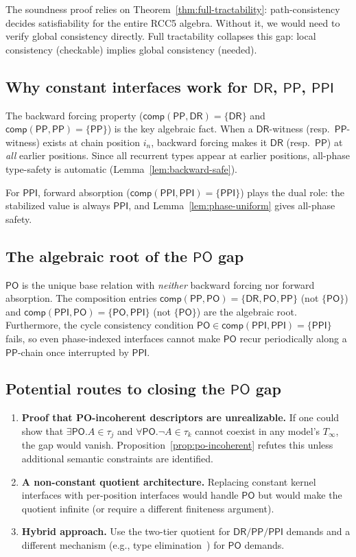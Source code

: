 \documentclass[a4paper,11pt]{article}
\theoremstyle{definition}
\newcommand{\DR}{\ensuremath{\mathsf{DR}}}
\newcommand{\PO}{\ensuremath{\mathsf{PO}}}
\newcommand{\PP}{\ensuremath{\mathsf{PP}}}
\newcommand{\PPI}{\ensuremath{\mathsf{PPI}}}
\newcommand{\comp}{\ensuremath{\mathsf{comp}}}
\begin{document}
The soundness proof relies on Theorem~\ref{thm:full-tractability}:
path-consistency decides satisfiability for the entire RCC5 algebra.
Without it, we would need to verify global consistency directly.
Full tractability collapses this gap: local consistency (checkable)
implies global consistency (needed).

\subsection{Why constant interfaces work for $\DR$, $\PP$, $\PPI$}

The backward forcing property ($\comp(\PP, \DR) = \{\DR\}$ and
$\comp(\PP, \PP) = \{\PP\}$) is the key algebraic fact.  When a
$\DR$-witness (resp.\ $\PP$-witness) exists at chain position $i_n$,
backward forcing makes it $\DR$ (resp.\ $\PP$) at \emph{all}
earlier positions.  Since all recurrent types appear at earlier
positions, all-phase type-safety is automatic
(Lemma~\ref{lem:backward-safe}).

For $\PPI$, forward absorption ($\comp(\PPI, \PPI) = \{\PPI\}$)
plays the dual role: the stabilized value is always $\PPI$, and
Lemma~\ref{lem:phase-uniform} gives all-phase safety.

\subsection{The algebraic root of the $\PO$ gap}

$\PO$ is the unique base relation with \emph{neither} backward
forcing nor forward absorption.  The composition entries
$\comp(\PP, \PO) = \{\DR, \PO, \PP\}$ (not $\{\PO\}$) and
$\comp(\PPI, \PO) = \{\PO, \PPI\}$ (not $\{\PO\}$) are the
algebraic root.  Furthermore, the cycle consistency condition
$\PO \in \comp(\PPI, \PPI) = \{\PPI\}$ fails, so even
phase-indexed interfaces cannot make $\PO$ recur periodically
along a $\PP$-chain once interrupted by $\PPI$.

\subsection{Potential routes to closing the $\PO$ gap}

\begin{enumerate}
\item \textbf{Proof that PO-incoherent descriptors are unrealizable.}\;
  If one could show that $\exists\PO.A \in \tau_j$ and
  $\forall\PO.\neg A \in \tau_k$ cannot coexist in any model's
  $T_\infty$, the gap would vanish.  Proposition~\ref{prop:po-incoherent}
  refutes this unless additional semantic constraints are identified.
\item \textbf{A non-constant quotient architecture.}\; Replacing
  constant kernel interfaces with per-position interfaces would
  handle $\PO$ but would make the quotient infinite (or require a
  different finiteness argument).
\item \textbf{Hybrid approach.}\; Use the two-tier quotient for
  $\DR/\PP/\PPI$ demands and a different mechanism (e.g., type
  elimination~\cite{Claude2026}) for $\PO$ demands.
\end{enumerate}
\end{document}

